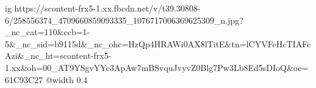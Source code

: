  
 
 
 
 

\ifcmt
  ig https://scontent-frx5-1.xx.fbcdn.net/v/t39.30808-6/258556374_4709660859093335_1076717006369625309_n.jpg?_nc_cat=110&ccb=1-5&_nc_sid=b9115d&_nc_ohc=HzQp4HRAWi0AX8lTitE&tn=lCYVFeHcTIAFcAzi&_nc_ht=scontent-frx5-1.xx&oh=00_AT9YSgvYYc3ApAw7mBSvquJvyvZ0Blg7Pw3Lb8Ed5sDIoQ&oe=61C93C27
  @width 0.4
\fi
